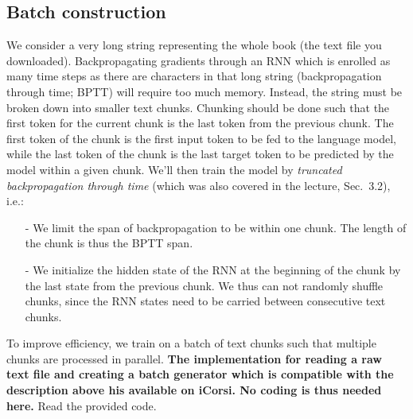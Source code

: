 \documentclass[a4paper,11pt]{article}
\begin{document}
\subsection{Batch construction}
We consider a very long string representing the whole book (the text file you downloaded).
Backpropagating gradients through an RNN which is enrolled as many time steps as there are characters
in that long string (backpropagation through time; BPTT) will require too much memory.
Instead, the string must be broken down into smaller text chunks.
Chunking should be done such that the first token for the current chunk is the last token from the previous chunk.
The first token of the chunk is the first input token to be fed to the language model,
while the last token of the chunk is the last target token to be predicted by the model within a given chunk.
We'll then train the model by \emph{truncated backpropagation through time}
(which was also covered in the lecture, Sec.~3.2), i.e.:
\begin{itemize}
\item[-] We limit the span of backpropagation to be within one chunk. The length of the chunk is thus the BPTT span.
\item[-] We initialize the hidden state of the RNN at the beginning of the chunk by the last state from the previous chunk.
We thus can not randomly shuffle chunks, since the RNN states need to be carried between consecutive text chunks.
\end{itemize}
To improve efficiency, we train on a batch of text chunks such that multiple chunks are processed in parallel.
\textbf{The implementation for reading a raw text file and creating a batch generator which is compatible with
the description above his available on iCorsi.
No coding is thus needed here.} Read the provided code.

\end{document}

